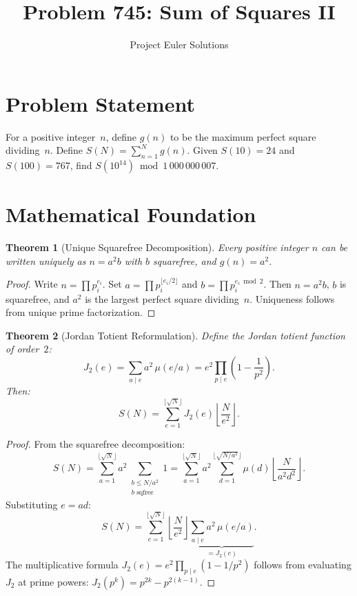 \documentclass[11pt]{article}
\title{Problem 745: Sum of Squares II}
\author{Project Euler Solutions}
\date{}
\newtheorem{theorem}{Theorem}
\theoremstyle{definition}
\begin{document}
\maketitle

\section{Problem Statement}

For a positive integer~$n$, define $g(n)$ to be the maximum perfect square dividing~$n$. Define $S(N) = \sum_{n=1}^{N} g(n)$. Given $S(10)=24$ and $S(100)=767$, find $S(10^{14}) \bmod 1\,000\,000\,007$.

\section{Mathematical Foundation}

\begin{theorem}[Unique Squarefree Decomposition]
Every positive integer $n$ can be written uniquely as $n = a^2 b$ with $b$ squarefree, and $g(n) = a^2$.
\end{theorem}

\begin{proof}
Write $n = \prod p_i^{e_i}$. Set $a = \prod p_i^{\lfloor e_i/2\rfloor}$ and $b = \prod p_i^{e_i \bmod 2}$. Then $n = a^2 b$, $b$ is squarefree, and $a^2$ is the largest perfect square dividing~$n$. Uniqueness follows from unique prime factorization.
\end{proof}

\begin{theorem}[Jordan Totient Reformulation]
Define the Jordan totient function of order~$2$:
\[
J_2(e) = \sum_{a \mid e} a^2\,\mu(e/a) = e^2 \prod_{p \mid e}\!\left(1 - \frac{1}{p^2}\right).
\]
Then:
\[
S(N) = \sum_{e=1}^{\lfloor\sqrt{N}\rfloor} J_2(e)\left\lfloor\frac{N}{e^2}\right\rfloor.
\]
\end{theorem}

\begin{proof}
From the squarefree decomposition:
\[
S(N) = \sum_{a=1}^{\lfloor\sqrt{N}\rfloor} a^2 \sum_{\substack{b \le N/a^2 \\ b\text{ sqfree}}} 1 = \sum_{a=1}^{\lfloor\sqrt{N}\rfloor} a^2 \sum_{d=1}^{\lfloor\sqrt{N/a^2}\rfloor} \mu(d)\left\lfloor\frac{N}{a^2 d^2}\right\rfloor.
\]
Substituting $e = ad$:
\[
S(N) = \sum_{e=1}^{\lfloor\sqrt{N}\rfloor}\left\lfloor\frac{N}{e^2}\right\rfloor \underbrace{\sum_{a \mid e} a^2\,\mu(e/a)}_{= J_2(e)}.
\]
The multiplicative formula $J_2(e) = e^2\prod_{p \mid e}(1-1/p^2)$ follows from evaluating $J_2$ at prime powers: $J_2(p^k) = p^{2k} - p^{2(k-1)}$.
\end{proof}
\end{document}
